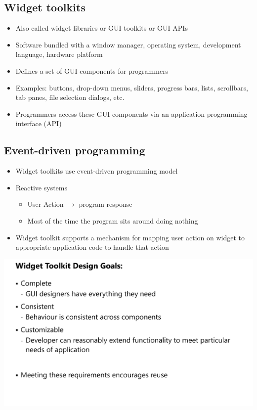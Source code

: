 \documentclass[twoside]{article}
\begin{document}
\subsection{Widget toolkits}
\begin{itemize}
\item Also called widget libraries or GUI toolkits or GUI APIs
\item  Software bundled with a window manager, operating system,
development language, hardware platform
\item Defines a set of GUI components for programmers
\item Examples: buttons, drop-down menus, sliders, progress bars, lists,
scrollbars, tab panes, file selection dialogs, etc.
\item Programmers access these GUI components via an application programming interface (API)
\end{itemize}

\subsection{Event-driven programming}
\begin{itemize}
\item Widget toolkits use event-driven programming model
\item Reactive systems 
\begin{itemize}
\item User Action \(\rightarrow\) program response
\item Most of the time the program sits around doing nothing
\end{itemize}
\item Widget toolkit supports a mechanism for mapping user action on widget to appropriate application code to handle that action
\end{itemize}

\begin{center}
\includegraphics[scale=0.2]{21}
\end{center}
\end{document}
